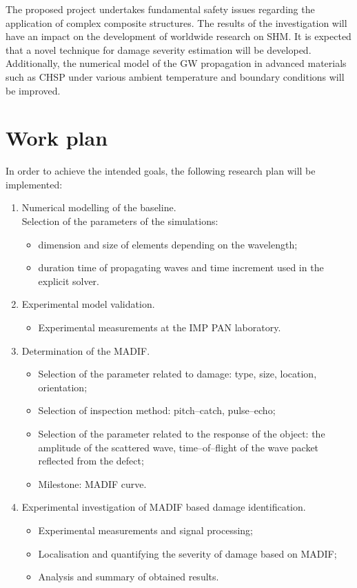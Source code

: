 \documentclass[a4paper,12pt]{article}
\begin{document}
The proposed project undertakes fundamental safety issues regarding the application of complex composite structures. The results of the investigation will have an impact on the development of worldwide research on SHM. It is expected that a novel technique for damage severity estimation will be developed.
Additionally, the numerical model of the GW propagation in advanced materials such as CHSP under various ambient temperature and boundary conditions will be improved.
\section{Work plan}
In order to achieve the intended goals, the following research plan will be implemented:
\begin{enumerate}[label=\Roman*.]
	\item Numerical modelling of the baseline.\\
	Selection of the parameters of the simulations:
	\begin{itemize}
		\item dimension and size of elements depending on the wavelength; 
		\item duration time of propagating waves and time increment used in the explicit solver.
	\end{itemize}
	\item Experimental model validation.
	\begin{itemize}
		\item Experimental measurements at the IMP PAN laboratory.
	\end{itemize}
	\item Determination of the MADIF.
	\begin{itemize}
		\item Selection of the parameter related to damage: type, size, location, orientation;
		\item Selection of inspection method: pitch--catch, pulse--echo;
		\item Selection of the parameter related to the response of the object: the amplitude of the scattered wave, time--of--flight of the wave packet reflected from the defect;
		\item Milestone: MADIF curve.
		\end{itemize}
	\item Experimental investigation of MADIF based damage identification.
	\begin{itemize}
		\item Experimental measurements and signal processing;
		\item Localisation and quantifying the severity of damage based on MADIF;
		\item Analysis and summary of obtained results.
	\end{itemize}
\end{enumerate}
\end{document}
